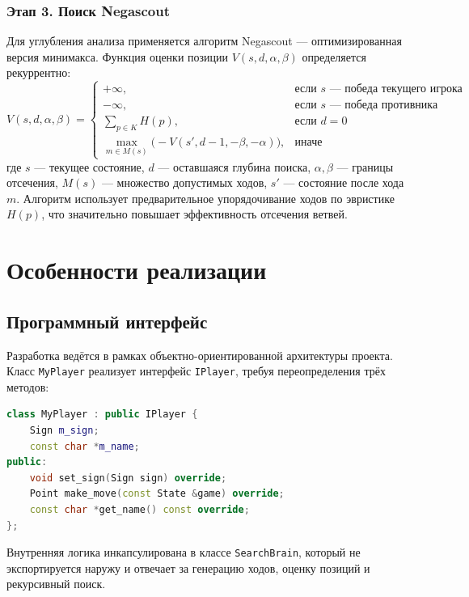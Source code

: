 \documentclass[12pt,a4paper]{article}
\begin{document}
\subsubsection*{Этап 3. Поиск Negascout}
Для углубления анализа применяется алгоритм Negascout — оптимизированная версия минимакса. Функция оценки позиции $V(s, d, \alpha, \beta)$ определяется рекуррентно:
\[
V(s, d, \alpha, \beta) = 
\begin{cases}
+\infty, & \text{если } s \text{ — победа текущего игрока} \\
-\infty, & \text{если } s \text{ — победа противника} \\
\sum_{p \in K} H(p), & \text{если } d = 0 \\
\max\limits_{m \in M(s)} \bigl( -V(s', d-1, -\beta, -\alpha) \bigr), & \text{иначе}
\end{cases}
\]
где $s$ — текущее состояние, $d$ — оставшаяся глубина поиска, $\alpha, \beta$ — границы отсечения, $M(s)$ — множество допустимых ходов, $s'$ — состояние после хода $m$. Алгоритм использует предварительное упорядочивание ходов по эвристике $H(p)$, что значительно повышает эффективность отсечения ветвей.

\section{Особенности реализации}

\subsection{Программный интерфейс}
Разработка ведётся в рамках объектно-ориентированной архитектуры проекта. Класс \texttt{MyPlayer} реализует интерфейс \texttt{IPlayer}, требуя переопределения трёх методов:
\begin{lstlisting}[language=C++, caption={Объявление класса игрока}]
class MyPlayer : public IPlayer {
    Sign m_sign;
    const char *m_name;
public:
    void set_sign(Sign sign) override;
    Point make_move(const State &game) override;
    const char *get_name() const override;
};
\end{lstlisting}
Внутренняя логика инкапсулирована в классе \texttt{SearchBrain}, который не экспортируется наружу и отвечает за генерацию ходов, оценку позиций и рекурсивный поиск.
\end{document}
